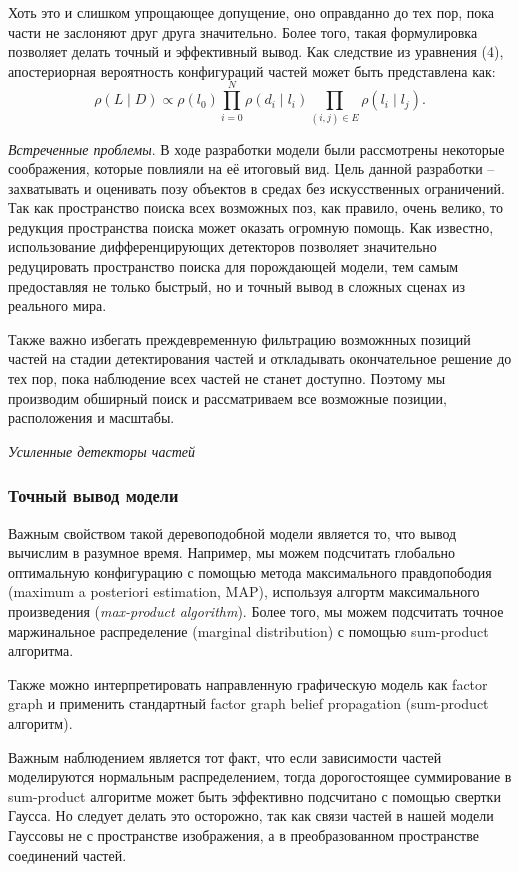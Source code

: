 Хоть это и слишком упрощающее допущение, оно оправданно до тех пор, пока части не заслоняют друг друга значительно. Более того, такая формулировка позволяет делать точный и эффективный вывод. Как следствие из уравнения (4), апостериорная вероятность конфигураций частей может быть представлена как:
\begin{equation}
  \rho(L{\mid}D) \propto \rho(l_0) \prod_{i = 0}^N\rho(d_i{\mid}l_i) \prod_{(i, j) \in E}\rho(l_i{\mid}l_j).
\end{equation}

\emph{Встреченные проблемы}. В ходе разработки модели были рассмотрены некоторые соображения, которые повлияли на её итоговый вид. Цель данной разработки -- захватывать и оценивать позу объектов в средах без искусственных ограничений. Так как пространство поиска всех возможных поз, как правило, очень велико, то редукция пространства поиска может оказать огромную помощь. Как известно, использование дифференцирующих детекторов позволяет значительно редуцировать пространство поиска для порождающей модели, тем самым предоставляя не только быстрый, но и точный вывод в сложных сценах из реального мира.

Также важно избегать преждевременную фильтрацию возможнных позиций частей на стадии детектирования частей и откладывать окончательное решение до тех пор, пока наблюдение всех частей не станет доступно. Поэтому мы производим обширный поиск и рассматриваем все возможные позиции, расположения и масштабы.

\emph{Усиленные детекторы частей}

\subsubsection{Точный вывод модели}

Важным свойством такой деревоподобной модели является то, что вывод вычислим в разумное время. Например, мы можем подсчитать глобально оптимальную конфигурацию с помощью метода максимального правдопободия (maximum a posteriori estimation, MAP), используя алгортм максимального произведения (\emph{max-product algorithm}). Более того, мы можем подсчитать точное маржинальное распределение (marginal distribution) с помощью sum-product алгоритма.

Также можно интерпретировать направленную графическую модель как factor graph и применить стандартный factor graph belief propagation (sum-product алгоритм).

Важным наблюдением является тот факт, что если зависимости частей моделируются нормальным распределением, тогда дорогостоящее суммирование в sum-product алгоритме может быть эффективно подсчитано с помощью свертки Гаусса. Но следует делать это осторожно, так как связи частей в нашей модели Гауссовы не с пространстве изображения, а в преобразованном пространстве соединений частей.

